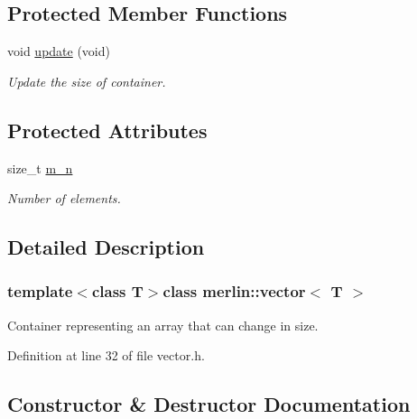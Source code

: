 \subsection*{Protected Member Functions}
\begin{DoxyCompactItemize}
\item 
\hypertarget{classmerlin_1_1vector_aa028c7af6c1149967f36241fa8b17d6c}{}void \hyperlink{classmerlin_1_1vector_aa028c7af6c1149967f36241fa8b17d6c}{update} (void)\label{classmerlin_1_1vector_aa028c7af6c1149967f36241fa8b17d6c}

\begin{DoxyCompactList}\small\item\em Update the size of container. \end{DoxyCompactList}\end{DoxyCompactItemize}
\subsection*{Protected Attributes}
\begin{DoxyCompactItemize}
\item 
\hypertarget{classmerlin_1_1vector_a1e8ed92fa4fd93cd512e6ef59fbbf704}{}size\+\_\+t \hyperlink{classmerlin_1_1vector_a1e8ed92fa4fd93cd512e6ef59fbbf704}{m\+\_\+n}\label{classmerlin_1_1vector_a1e8ed92fa4fd93cd512e6ef59fbbf704}

\begin{DoxyCompactList}\small\item\em Number of elements. \end{DoxyCompactList}\end{DoxyCompactItemize}


\subsection{Detailed Description}
\subsubsection*{template$<$class T$>$class merlin\+::vector$<$ T $>$}

Container representing an array that can change in size. 

Definition at line 32 of file vector.\+h.



\subsection{Constructor \& Destructor Documentation}
\hypertarget{classmerlin_1_1vector_aebdbc7cbb94b53343d7a0b5059ea2e0f}{}
